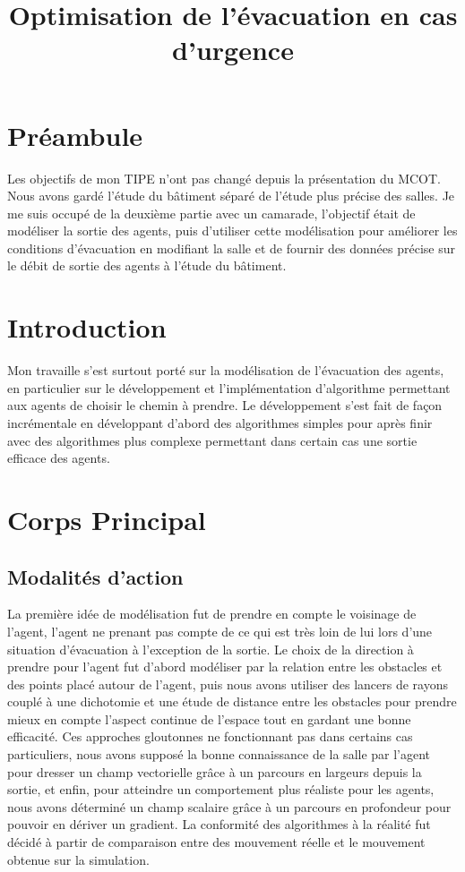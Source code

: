\documentclass{article}
\title{Optimisation de l'évacuation en cas d'urgence}
\begin{document}
\maketitle

\section{Préambule}

Les objectifs de mon TIPE n'ont pas changé depuis la présentation du MCOT.
Nous avons gardé l'étude du bâtiment séparé de l'étude plus précise des salles.
Je me suis occupé de la deuxième partie avec un camarade, l'objectif était de
modéliser la sortie des agents, puis d'utiliser cette modélisation
pour améliorer les conditions d'évacuation en modifiant la salle et de
fournir des données précise sur le débit de sortie des agents à l'étude du bâtiment.

\section{Introduction}

Mon travaille s'est surtout porté sur la modélisation de l'évacuation des
agents, en particulier sur le développement et l'implémentation
d'algorithme permettant aux agents de choisir le chemin à prendre.
Le développement s'est fait de façon incrémentale en développant d'abord
des algorithmes simples pour après finir avec des algorithmes plus complexe
permettant dans certain cas une sortie efficace des agents.

\section{Corps Principal}

\subsection{Modalités d'action}

La première idée de modélisation fut de prendre en compte le voisinage de l'agent,
l'agent ne prenant pas compte de ce qui est très loin de lui lors d'une situation
d'évacuation à l'exception de la sortie. Le choix de la direction à prendre pour
l'agent fut d'abord modéliser par la relation
entre les obstacles et des points placé autour de l'agent, puis nous avons utiliser
des lancers de rayons couplé à une dichotomie et une étude de distance entre les
obstacles pour prendre mieux en compte l'aspect continue de l'espace tout en gardant
une bonne efficacité. Ces approches gloutonnes ne fonctionnant pas dans certains
cas particuliers, nous avons supposé la bonne connaissance de la salle par l'agent
pour dresser un champ vectorielle grâce à un parcours en largeurs depuis la sortie,
et enfin, pour atteindre un comportement plus réaliste pour les agents, nous avons
déterminé un champ scalaire grâce à un parcours en profondeur pour pouvoir en dériver
un gradient. La conformité des algorithmes à la réalité fut décidé à partir de
comparaison entre des mouvement réelle et le mouvement obtenue sur la simulation.
\end{document}

